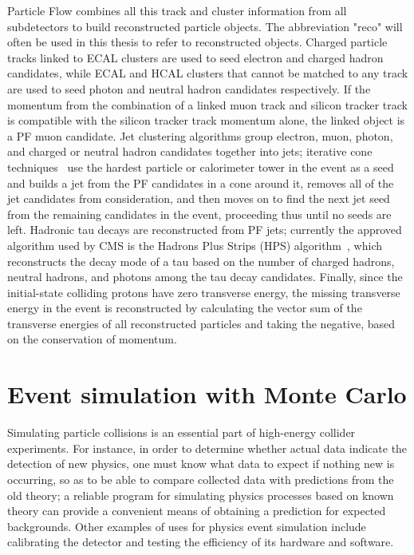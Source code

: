 Particle Flow combines all this track and cluster information from all subdetectors to build reconstructed particle objects. The abbreviation "reco" will often be used in this thesis to refer to reconstructed objects. Charged particle tracks linked to ECAL clusters are used to seed electron and charged hadron candidates, while ECAL and HCAL clusters that cannot be matched to any track are used to seed photon and neutral hadron candidates respectively. If the momentum from the combination of a linked muon track and silicon tracker track is compatible with the silicon tracker track momentum alone, the linked object is a PF muon candidate. Jet clustering algorithms group electron, muon, photon, and charged or neutral hadron candidates together into jets; iterative cone techniques~\cite{1126-6708-2008-04-063} use the hardest particle or calorimeter tower in the event as a seed and builds a jet from the PF candidates in a cone around it, removes all of the jet candidates from consideration, and then moves on to find the next jet seed from the remaining candidates in the event, proceeding thus until no seeds are left. Hadronic tau decays are reconstructed from PF jets; currently the approved algorithm used by CMS is the Hadrons Plus Strips (HPS) algorithm~\cite{CMS:2011msa}, which reconstructs the decay mode of a tau based on the number of charged hadrons, neutral hadrons, and photons among the tau decay candidates. Finally, since the initial-state colliding protons have zero transverse energy, the missing transverse energy in the event is reconstructed by calculating the vector sum of the transverse energies of all reconstructed particles and taking the negative, based on the conservation of momentum.

\section{Event simulation with Monte Carlo\label{sec:cms-sim}}

Simulating particle collisions is an essential part of high-energy collider experiments. For instance, in order to determine whether actual data indicate the detection of new physics, one must know what data to expect if nothing new is occurring, so as to be able to compare collected data with predictions from the old theory; a reliable program for simulating physics processes based on known theory can provide a convenient means of obtaining a prediction for expected backgrounds. Other examples of uses for physics event simulation include calibrating the detector and testing the efficiency of its hardware and software.

